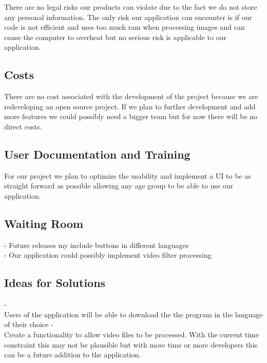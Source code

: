 \documentclass[12pt, titlepage]{article}
\begin{document}
There are no legal risks our products can violate due to the fact we do not store any personal information. The only risk our application can encounter is if our code is not efficient and uses too much ram when processing images and can cause the computer to overheat but no serious risk is applicable to our application.

\subsection{Costs}

There are no cost associated with the development of the project because we are redeveloping an open source project. If we plan to further development and add more features we could possibly need a bigger team but for now there will be no direct costs.

\subsection{User Documentation and Training}

For our project we plan to optimize the usability and implement a UI to be as straight forward as possible allowing any age group to be able to use our application.

\subsection{Waiting Room}

- Future releases my include buttons in different languages\\
- Our application could possibly implement video filter  processing\\

\subsection{Ideas for Solutions}

- \\ Users of the application will be able to download the the program in the language of their choice
- \\ Create a functionality to allow video files to be processed. With the current time constraint this may not be plausible but with more time or more developers this can be a future addition to the application.






\end{document}
